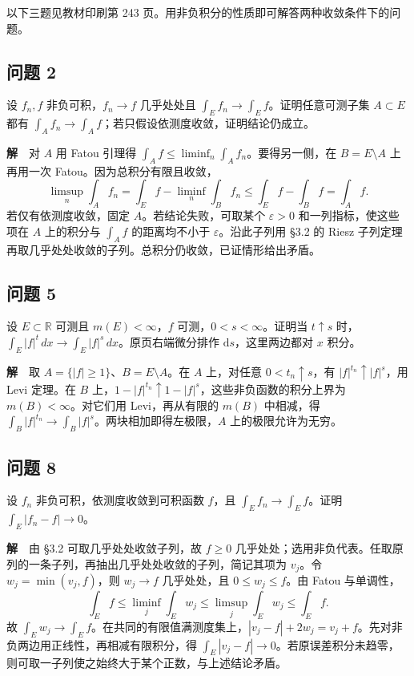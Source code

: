 \documentclass[11pt,a4paper]{article}
\begin{document}
以下三题见教材印刷第 243
页。用非负积分的性质即可解答两种收敛条件下的问题。

\subsection{问题 2}\label{ux95eeux9898-2-1}

设 \(f_n,f\) 非负可积，\(f_n\to f\) 几乎处处且
\(\int_E f_n\to\int_E f\)。证明任意可测子集 \(A\subset E\) 都有
\(\int_A f_n\to\int_A f\)；若只假设依测度收敛，证明结论仍成立。

\textbf{解}　对 \(A\) 用 Fatou 引理得
\(\int_A f\le\liminf_n\int_A f_n\)。要得另一侧，在 \(B=E\setminus A\)
上再用一次 Fatou。因为总积分有限且收敛， \begin{equation*}
\limsup_n\int_A f_n
=\int_E f-\liminf_n\int_B f_n
\le\int_E f-\int_B f=\int_A f .
\end{equation*} 若仅有依测度收敛，固定 \(A\)。若结论失败，可取某个 \(\varepsilon>0\)
和一列指标，使这些项在 \(A\) 上的积分与 \(\int_A f\) 的距离均不小于
\(\varepsilon\)。沿此子列用 §3.2 的 Riesz
子列定理再取几乎处处收敛的子列。总积分仍收敛，已证情形给出矛盾。

\subsection{问题 5}\label{ux95eeux9898-5-1}

设 \(E\subset\mathbb R\) 可测且 \(m(E)<\infty\)，\(f\)
可测，\(0<s<\infty\)。证明当 \(t\uparrow s\)
时，\(\int_E|f|^t\,dx\to\int_E|f|^s\,dx\)。原页右端微分排作
\(\mathrm ds\)，这里两边都对 \(x\) 积分。

\textbf{解}　取 \(A=\{|f|\ge1\}\)、\(B=E\setminus A\)。在 \(A\)
上，对任意 \(0<t_n\uparrow s\)，有 \(|f|^{t_n}\uparrow|f|^s\)，用 Levi
定理。在 \(B\)
上，\(1-|f|^{t_n}\uparrow1-|f|^s\)，这些非负函数的积分上界为
\(m(B)<\infty\)。对它们用 Levi，再从有限的 \(m(B)\) 中相减，得
\(\int_B|f|^{t_n}\to\int_B|f|^s\)。两块相加即得左极限，\(A\)
上的极限允许为无穷。

\subsection{问题 8}\label{ux95eeux9898-8}

设 \(f_n\) 非负可积，依测度收敛到可积函数 \(f\)，且
\(\int_E f_n\to\int_E f\)。证明 \(\int_E|f_n-f|\to0\)。

\textbf{解}　由 §3.2 可取几乎处处收敛子列，故 \(f\ge0\)
几乎处处；选用非负代表。任取原列的一条子列，再抽出几乎处处收敛的子列，简记其项为
\(v_j\)。令 \(w_j=\min(v_j,f)\)，则 \(w_j\to f\) 几乎处处，且
\(0\le w_j\le f\)。由 Fatou 与单调性， \begin{equation*}
\int_E f\le\liminf_j\int_E w_j\le\limsup_j\int_E w_j\le\int_E f .
\end{equation*} 故
\(\int_E w_j\to\int_E f\)。在共同的有限值满测度集上，\(|v_j-f|+2w_j=v_j+f\)。先对非负两边用正线性，再相减有限积分，得
\(\int_E|v_j-f|\to0\)。若原误差积分未趋零，则可取一子列使之始终大于某个正数，与上述结论矛盾。
\end{document}
